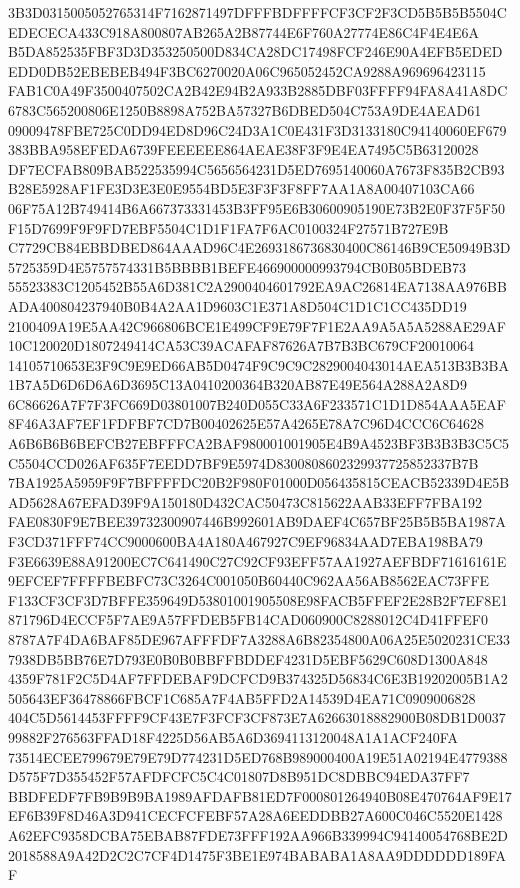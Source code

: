 \documentclass[UTF8,fontset=fandol,zihao=-4,a4paper]{ctexart}
\begin{document}
{{3B3D0315005052765314F7162871497DFFFBDFFFFCF3CF2F3CD5B5B5B5504CEDECECA433C918A800807AB265A2B87744E6F760A27774E86C4F4E4E6A
B5DA852535FBF3D3D353250500D834CA28DC17498FCF246E90A4EFB5EDEDEDD0DB52EBEBEB494F3BC6270020A06C965052452CA9288A969696423115
FAB1C0A49F3500407502CA2B42E94B2A933B2885DBF03FFFF94FA8A41A8DC6783C565200806E1250B8898A752BA57327B6DBED504C753A9DE4AEAD61
09009478FBE725C0DD94ED8D96C24D3A1C0E431F3D3133180C94140060EF679383BBA958EFEDA6739FEEEEEE864AEAE38F3F9E4EA7495C5B63120028
DF7ECFAB809BAB522535994C5656564231D5ED7695140060A7673F835B2CB93B28E5928AF1FE3D3E3E0E9554BD5E3F3F3F8FF7AA1A8A00407103CA66
06F75A12B749414B6A667373331453B3FF95E6B30600905190E73B2E0F37F5F50F15D7699F9F9FD7EBF5504C1D1F1FA7F6AC0100324F27571B727E9B
C7729CB84EBBDBED864AAAD96C4E2693186736830400C86146B9CE50949B3D5725359D4E5757574331B5BBBB1BEFE466900000993794CB0B05BDEB73
55523383C1205452B55A6D381C2A2900404601792EA9AC26814EA7138AA976BBADA400804237940B0B4A2AA1D9603C1E371A8D504C1D1C1CC435DD19
2100409A19E5AA42C966806BCE1E499CF9E79F7F1E2AA9A5A5A5288AE29AF10C120020D1807249414CA53C39ACAFAF87626A7B7B3BC679CF20010064
14105710653E3F9C9E9ED66AB5D0474F9C9C9C2829004043014AEA513B3B3BA1B7A5D6D6D6A6D3695C13A0410200364B320AB87E49E564A288A2A8D9
6C86626A7F7F3FC669D03801007B240D055C33A6F233571C1D1D854AAA5EAF8F46A3AF7EF1FDFBF7CD7B00402625E57A4265E78A7C96D4CCC6C64628
A6B6B6B6BEFCB27EBFFFCA2BAF980001001905E4B9A4523BF3B3B3B3C5C5C5504CCD026AF635F7EEDD7BF9E5974D8300808602329937725852337B7B
7BA1925A5959F9F7BFFFFDC20B2F980F01000D056435815CEACB52339D4E5BAD5628A67EFAD39F9A150180D432CAC50473C815622AAB33EFF7FBA192
FAE0830F9E7BEE39732300907446B992601AB9DAEF4C657BF25B5B5BA1987AF3CD371FFF74CC9000600BA4A180A467927C9EF96834AAD7EBA198BA79
F3E6639E88A91200EC7C641490C27C92CF93EFF57AA1927AEFBDF71616161E9EFCEF7FFFFBEBFC73C3264C001050B60440C962AA56AB8562EAC73FFE
F133CF3CF3D7BFFE359649D53801001905508E98FACB5FFEF2E28B2F7EF8E1871796D4ECCF5F7AE9A57FFDEB5FB14CAD060900C8288012C4D41FFEF0
8787A7F4DA6BAF85DE967AFFFDF7A3288A6B82354800A06A25E5020231CE337938DB5BB76E7D793E0B0B0BBFFBDDEF4231D5EBF5629C608D1300A848
4359F781F2C5D4AF7FFDEBAF9DCFCD9B374325D56834C6E3B19202005B1A2505643EF36478866FBCF1C685A7F4AB5FFD2A14539D4EA71C0909006828
404C5D5614453FFFF9CF43E7F3FCF3CF873E7A62663018882900B08DB1D003799882F276563FFAD18F4225D56AB5A6D3694113120048A1A1ACF240FA
73514ECEE799679E79E79D774231D5ED768B989000400A19E51A02194E4779388D575F7D355452F57AFDFCFC5C4C01807D8B951DC8DBBC94EDA37FF7
BBDFEDF7FB9B9B9BA1989AFDAFB81ED7F000801264940B08E470764AF9E17EF6B39F8D46A3D941CECFCFEBF57A28A6EEDDBB27A600C046C5520E1428
A62EFC9358DCBA75EBAB87FDE73FFF192AA966B339994C94140054768BE2D2018588A9A42D2C2C7CF4D1475F3BE1E974BABABA1A8AA9DDDDDD189FAF
}}
\end{document}
